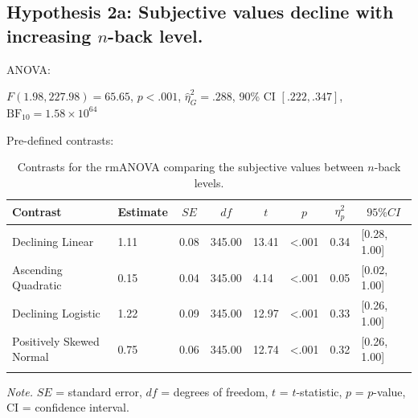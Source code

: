\documentclass[
  man,floatsintext]{apa6}
\begin{document}
\newpage

\hypertarget{hypothesis-2a-subjective-values-decline-with-increasing-n-back-level.}{%
\subsection{\texorpdfstring{Hypothesis 2a: Subjective values decline with increasing \(n\)-back level.}{Hypothesis 2a: Subjective values decline with increasing n-back level.}}\label{hypothesis-2a-subjective-values-decline-with-increasing-n-back-level.}}

ANOVA:

\(F(1.98, 227.98) = 65.65\), \(p < .001\), \(\hat{\eta}^2_G = .288\), 90\% CI \([.222, .347]\), \(\mathrm{BF}_{\textrm{10}} = 1.58 \times 10^{64}\)

Pre-defined contrasts:

\begin{table}[H]

\begin{center}
\begin{threeparttable}

\caption{\label{tab:unnamed-chunk-9}Contrasts for the rmANOVA comparing the subjective values between $n$-back levels.}

\begin{tabular}{llllllll}
\toprule
Contrast & \multicolumn{1}{c}{Estimate} & \multicolumn{1}{c}{$SE$} & \multicolumn{1}{c}{$df$} & \multicolumn{1}{c}{$t$} & \multicolumn{1}{c}{$p$} & \multicolumn{1}{c}{$\eta_{p}^{2}$} & \multicolumn{1}{c}{$95\% CI$}\\
\midrule
Declining Linear & 1.11 & 0.08 & 345.00 & 13.41 & <.001 & 0.34 & {}[0.28, 1.00]\\
Ascending Quadratic & 0.15 & 0.04 & 345.00 & 4.14 & <.001 & 0.05 & {}[0.02, 1.00]\\
Declining Logistic & 1.22 & 0.09 & 345.00 & 12.97 & <.001 & 0.33 & {}[0.26, 1.00]\\
Positively Skewed Normal & 0.75 & 0.06 & 345.00 & 12.74 & <.001 & 0.32 & {}[0.26, 1.00]\\
\bottomrule
\addlinespace
\end{tabular}

\begin{tablenotes}[para]
\normalsize{\textit{Note.} $SE$ = standard error, $df$ = degrees of freedom, $t$ = $t$-statistic, $p$ = $p$-value, CI = confidence interval.}
\end{tablenotes}

\end{threeparttable}
\end{center}

\end{table}
\end{document}
